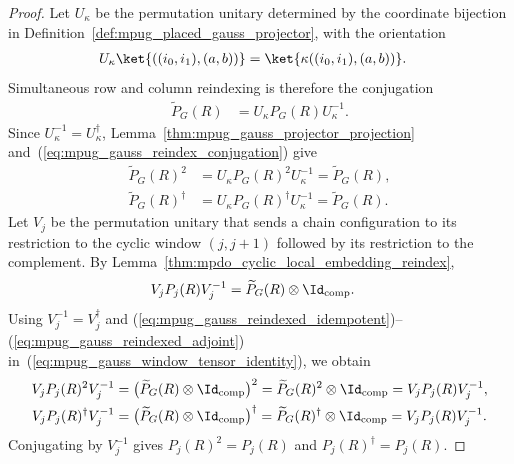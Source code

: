 \begin{proof}\leanok
    Let $U_\kappa$ be the permutation unitary determined by the coordinate
    bijection in Definition~\ref{def:mpug_placed_gauss_projector}, with the
    orientation
    \begin{align}
        U_\kappa\ket{((i_0,i_1),(a,b))}
         & =\ket{\kappa((i_0,i_1),(a,b))}.
        \notag
    \end{align}
    Simultaneous row and column reindexing is therefore the conjugation
    \begin{align}
        \widetilde P_G(R)
         & =U_\kappa P_G(R)U_\kappa^{-1}.
        \label{eq:mpug_gauss_reindex_conjugation}
    \end{align}
    Since $U_\kappa^{-1}=U_\kappa^\dagger$, Lemma~\ref{thm:mpug_gauss_projector_projection}
    and~(\ref{eq:mpug_gauss_reindex_conjugation}) give
    \begin{align}
        \widetilde P_G(R)^2
         & =U_\kappa P_G(R)^2U_\kappa^{-1}
        =\widetilde P_G(R),
        \label{eq:mpug_gauss_reindexed_idempotent} \\
        \widetilde P_G(R)^\dagger
         & =U_\kappa P_G(R)^\dagger U_\kappa^{-1}
        =\widetilde P_G(R).
        \label{eq:mpug_gauss_reindexed_adjoint}
    \end{align}
    Let $V_j$ be the permutation unitary that sends a chain configuration to
    its restriction to the cyclic window $(j,j+1)$ followed by its restriction
    to the complement. By Lemma~\ref{thm:mpdo_cyclic_local_embedding_reindex},
    \begin{align}
        V_jP_j(R)V_j^{-1}
         & =\widetilde P_G(R)\otimes\Id_{\mathrm{comp}}.
        \label{eq:mpug_gauss_window_tensor_identity}
    \end{align}
    Using $V_j^{-1}=V_j^\dagger$ and
    (\ref{eq:mpug_gauss_reindexed_idempotent})--(\ref{eq:mpug_gauss_reindexed_adjoint})
    in~(\ref{eq:mpug_gauss_window_tensor_identity}), we obtain
    \begin{align}
        V_jP_j(R)^2V_j^{-1}
         & =\bigl(\widetilde P_G(R)\otimes\Id_{\mathrm{comp}}\bigr)^2
        =\widetilde P_G(R)^2\otimes\Id_{\mathrm{comp}}
        =V_jP_j(R)V_j^{-1},                                                 \\
        V_jP_j(R)^\dagger V_j^{-1}
         & =\bigl(\widetilde P_G(R)\otimes\Id_{\mathrm{comp}}\bigr)^\dagger
        =\widetilde P_G(R)^\dagger\otimes\Id_{\mathrm{comp}}
        =V_jP_j(R)V_j^{-1}.
    \end{align}
    Conjugating by $V_j^{-1}$ gives $P_j(R)^2=P_j(R)$ and
    $P_j(R)^\dagger=P_j(R)$.
\end{proof}

